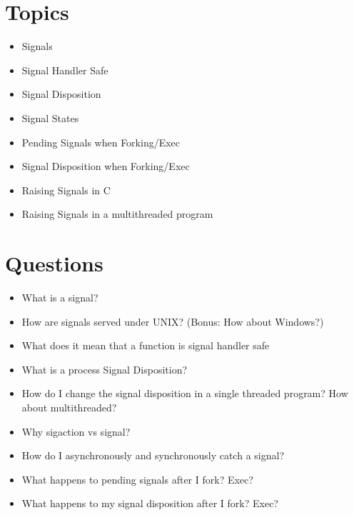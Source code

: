 \section{Topics}\label{topics}

\begin{itemize}
\tightlist
\item
  Signals
\item
  Signal Handler Safe
\item
  Signal Disposition
\item
  Signal States
\item
  Pending Signals when Forking/Exec
\item
  Signal Disposition when Forking/Exec
\item
  Raising Signals in C
\item
  Raising Signals in a multithreaded program
\end{itemize}

\section{Questions}\label{questions}

\begin{itemize}
\tightlist
\item
  What is a signal?
\item
  How are signals served under UNIX? (Bonus: How about Windows?)
\item
  What does it mean that a function is signal handler safe
\item
  What is a process Signal Disposition?
\item
  How do I change the signal disposition in a single threaded program?
  How about multithreaded?
\item
  Why sigaction vs signal?
\item
  How do I asynchronously and synchronously catch a signal?
\item
  What happens to pending signals after I fork? Exec?
\item
  What happens to my signal disposition after I fork? Exec?
\end{itemize}
